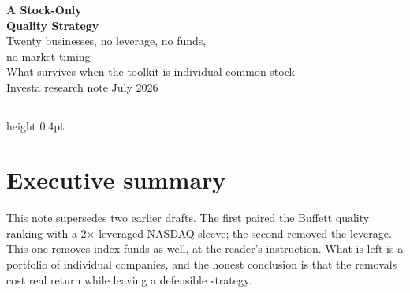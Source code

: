 \documentclass[11pt,a4paper]{article}
\begin{document}
\thispagestyle{empty}
\begin{center}
\vspace*{1.2cm}
{\sffamily\Huge\bfseries A Stock-Only\\[0.15em] Quality Strategy}\\[0.5em]
{\sffamily\Large\color{ink2} Twenty businesses, no leverage, no funds,\\ no market timing}\\[1.4em]
{\sffamily\large\color{muted} What survives when the toolkit is individual common stock}\\[0.8em]
{\sffamily\normalsize\color{muted} Investa research note \quad\textbullet{} July 2026}
\end{center}

\vspace{1.2cm}
\hrule height 0.4pt
\vspace{0.9em}

\section*{\sffamily Executive summary}

This note supersedes two earlier drafts. The first paired the Buffett quality
ranking with a 2$\times$ leveraged NASDAQ sleeve; the second removed the
leverage. This one removes index funds as well, at the reader's instruction.
What is left is a portfolio of individual companies, and the honest conclusion
is that the removals cost real return while leaving a defensible strategy.
\end{document}
